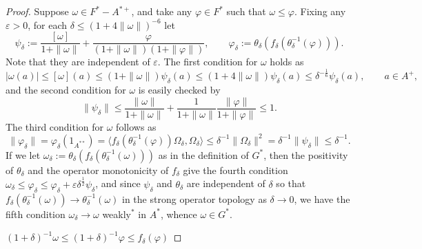 \documentclass[noamsfonts,a4paper,10pt]{amsart}
\theoremstyle{plain}
\theoremstyle{definition}
\theoremstyle{remark}
\begin{document}
\begin{proof}
Suppose $\omega\in F^*-A^{*+}$, and take any $\varphi\in F^*$ such that $\omega\le\varphi$.
Fixing any $\varepsilon>0$, for each $\delta\le(1+4\|\omega\|)^{-6}$ let
\[\psi_\delta:=\frac{[\omega]}{1+\|\omega\|}+\frac\varphi{(1+\|\omega\|)(1+\|\varphi\|)},\qquad\varphi_\delta:=\theta_\delta(f_\delta(\theta_\delta^{-1}(\varphi))).\]
Note that they are independent of $\varepsilon$.
The first condition for $\omega$ holds as
\[|\omega(a)|\le[\omega](a)\le(1+\|\omega\|)\psi_\delta(a)\le(1+4\|\omega\|)\psi_\delta(a)\le\delta^{-\frac16}\psi_\delta(a),\qquad a\in A^+,\]
and the second condition for $\omega$ is easily checked by
\[\|\psi_\delta\|\le\frac{\|\omega\|}{1+\|\omega\|}+\frac1{1+\|\omega\|}\frac{\|\varphi\|}{1+\|\varphi\|}\le1.\]
The third condition for $\omega$ follows as
\[\|\varphi_\delta\|=\varphi_\delta(1_{A^{**}})=\langle f_\delta(\theta_\delta^{-1}(\varphi))\Omega_\delta,\Omega_\delta\rangle\le\delta^{-1}\|\Omega_\delta\|^2=\delta^{-1}\|\psi_\delta\|\le\delta^{-1}.\]
If we let $\omega_\delta:=\theta_\delta(f_\delta(\theta_\delta^{-1}(\omega)))$ as in the definition of $G^*$, then the positivity of $\theta_\delta$ and the operator monotonicity of $f_\delta$ give the fourth condition $\omega_\delta\le\varphi_\delta\le\varphi_\delta+\varepsilon\delta^{\frac12}\psi_\delta$, and since $\psi_\delta$ and $\theta_\delta$ are independent of $\delta$ so that $f_\delta(\theta_\delta^{-1}(\omega))\to\theta_\delta^{-1}(\omega)$ in the strong operator topology as $\delta\to0$, we have the fifth condition $\omega_\delta\to\omega$ weakly$^*$ in $A^*$, whence $\omega\in G^*$.

$(1+\delta)^{-1}\omega\le(1+\delta)^{-1}\varphi\le f_\delta(\varphi)$


\end{proof}
\end{document}
